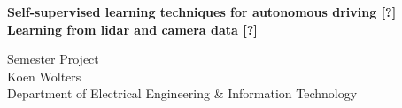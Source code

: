 %

\begin{titlepage}

\thispagestyle{empty}




\vspace*{2cm}
\begin{center}
\Huge{\textbf{Self-supervised learning techniques for autonomous driving [?]}\\}
\LARGE{\textbf{Learning from lidar and camera data [?]}\\[1cm]}

\large{Semester Project\\[0.8cm]}
\LARGE{Koen Wolters\\}
\normalsize{Department of Electrical Engineering \& Information Technology}
\end{center}

\begin{center}
 




\end{center}
\end{titlepage}
